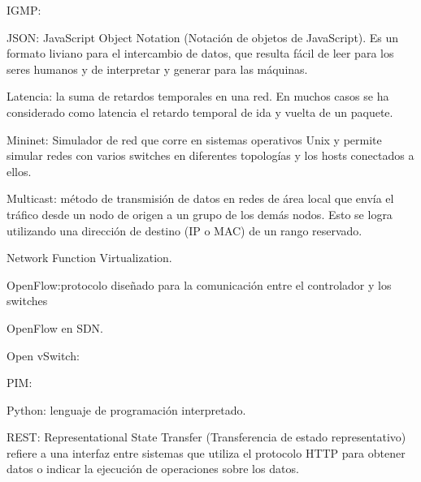 \documentclass[12pt,a4paper,oneside]{book}
\begin{document}
\vspace{0,5cm}

IGMP:

\vspace{0,5cm}

JSON: JavaScript Object Notation (Notación de objetos de JavaScript). Es un formato liviano para el intercambio de datos, que resulta fácil de leer para los seres humanos y de interpretar y generar para las máquinas.

\vspace{0,5cm}

Latencia: la suma de retardos temporales en una red. En muchos casos se ha considerado como latencia el retardo temporal de ida y vuelta de un paquete.

\vspace{0,5cm}

Mininet: Simulador de red que corre en sistemas operativos Unix y permite simular redes con varios switches en diferentes topologías y los hosts conectados a ellos.

\vspace{0,5cm}

Multicast: método de transmisión de datos en redes de área local que envía el tráfico desde un nodo de origen a un grupo de los demás nodos. Esto se logra utilizando una dirección de destino (IP o MAC) de un rango reservado.

\vspace{0,5cm}

Network Function Virtualization.

\vspace{0,5cm}

OpenFlow:protocolo diseñado para la comunicación entre el controlador y los switches 

\vspace{0,5cm}

OpenFlow en SDN.

\vspace{0,5cm}

Open vSwitch:

\vspace{0,5cm}

PIM:

\vspace{0,5cm}

Python: lenguaje de programación interpretado.

\vspace{0,5cm}

REST: Representational State Transfer (Transferencia de estado representativo) refiere a una interfaz entre sistemas que utiliza el protocolo HTTP para obtener datos o indicar la ejecución de operaciones sobre los datos.
\end{document}
